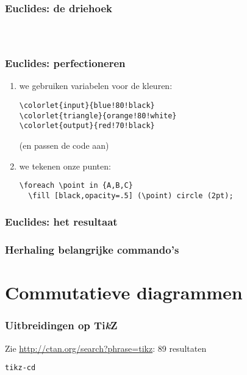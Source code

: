 \documentclass[]{beamer}
\newcommand\TikZ{Ti\textit{k}Z\xspace}
\begin{document}
\begin{frame}
  \frametitle{Euclides: de driehoek}

  \begin{columns}
    \begin{column}{.67\textwidth}
      \inputminted[fontsize = \scriptsize]{latex}{tikz/triangle/4a.tikz}
    \end{column}
    \begin{column}{.33\textwidth}
      
    \end{column}
  \end{columns}
\end{frame}

\begin{frame}[fragile]
  \frametitle{Euclides: perfectioneren}

  \begin{enumerate}
    \item we gebruiken variabelen voor de kleuren:
      \begin{verbatim}
\colorlet{input}{blue!80!black}
\colorlet{triangle}{orange!80!white}
\colorlet{output}{red!70!black}
      \end{verbatim}
      (en passen de code aan)
    \item\pause we tekenen onze punten:
      \begin{verbatim}
\foreach \point in {A,B,C}
  \fill [black,opacity=.5] (\point) circle (2pt);
      \end{verbatim}
  \end{enumerate}
\end{frame}

\begin{frame}
  \frametitle{Euclides: het resultaat}

  \centering
  
\end{frame}

\begin{frame}
  \frametitle{Herhaling belangrijke commando's}
\end{frame}


\section{Commutatieve diagrammen}

\begin{frame}
  \frametitle{Uitbreidingen op \TikZ}

  Zie \url{http://ctan.org/search?phrase=tikz}: 89 resultaten

  \begin{description}
    \item[\texttt{tikz-cd}]
  \end{description}
\end{frame}
\end{document}
